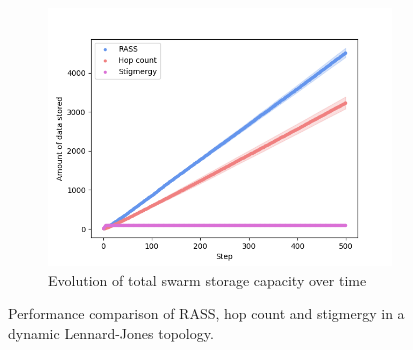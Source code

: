 \documentclass[letterpaper, 10 pt, conference]{ieeeconf}
\begin{document}
\begin{figure}
\begin{subfigure}{0.30\textwidth}
        \includegraphics[width=\textwidth]{figures/lennard_storage.png}
        \caption{Evolution of total swarm storage capacity over time}
        \label{results:lennard_100_storage}
    \end{subfigure}
    \caption{Performance comparison of RASS, hop count and stigmergy in a dynamic Lennard-Jones topology.}
    \label{results:dynamicTopologyLennard}
    \vspace{-2mm}
\end{figure}
\end{document}
